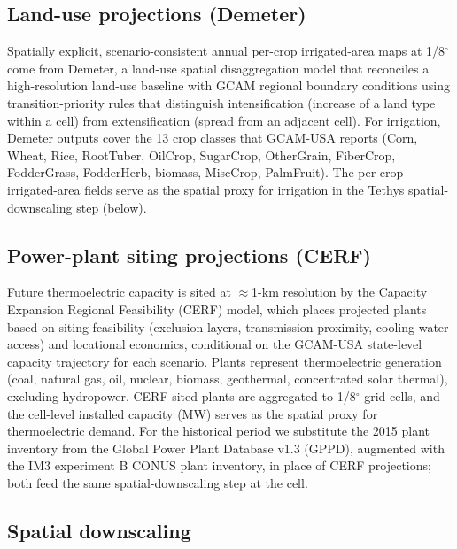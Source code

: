 \documentclass[fleqn,10pt]{wlscirep}
\begin{document}
\subsection*{Land-use projections (Demeter)}

Spatially explicit, scenario-consistent annual per-crop irrigated-area maps at 1/8$^{\circ}$ come from Demeter\cite{Vernon-2018}, a land-use spatial disaggregation model that reconciles a high-resolution land-use baseline with GCAM regional boundary conditions using transition-priority rules that distinguish intensification (increase of a land type within a cell) from extensification (spread from an adjacent cell). For irrigation, Demeter outputs cover the 13 crop classes that GCAM-USA reports (Corn, Wheat, Rice, RootTuber, OilCrop, SugarCrop, OtherGrain, FiberCrop, FodderGrass, FodderHerb, biomass, MiscCrop, PalmFruit). The per-crop irrigated-area fields serve as the spatial proxy for irrigation in the Tethys spatial-downscaling step (below).

\subsection*{Power-plant siting projections (CERF)}

Future thermoelectric capacity is sited at $\approx$1-km resolution by the Capacity Expansion Regional Feasibility (CERF) model\cite{Vernon2021,Mongird2025CERF}, which places projected plants based on siting feasibility (exclusion layers, transmission proximity, cooling-water access) and locational economics, conditional on the GCAM-USA state-level capacity trajectory for each scenario. Plants represent thermoelectric generation (coal, natural gas, oil, nuclear, biomass, geothermal, concentrated solar thermal), excluding hydropower. CERF-sited plants are aggregated to 1/8$^{\circ}$ grid cells, and the cell-level installed capacity (MW) serves as the spatial proxy for thermoelectric demand. For the historical period we substitute the 2015 plant inventory from the Global Power Plant Database v1.3 (GPPD), augmented with the IM3 experiment B CONUS plant inventory, in place of CERF projections; both feed the same spatial-downscaling step at the cell.

\subsection*{Spatial downscaling}
\end{document}
